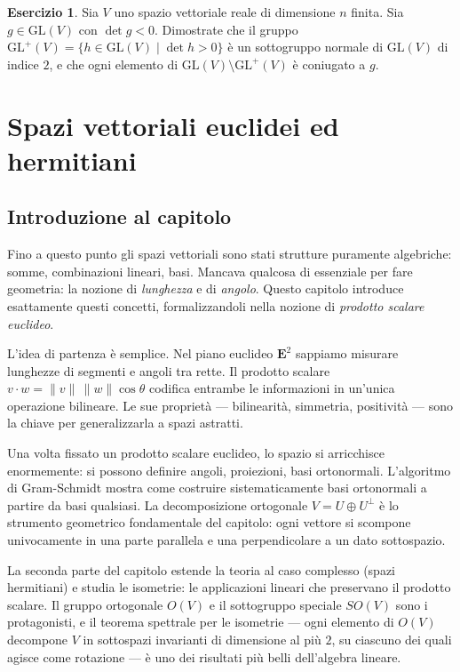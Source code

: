 \documentclass[11pt, a4paper]{book}
\theoremstyle{definition}
\newtheorem{esercizio}[definizione]{Esercizio}
\theoremstyle{plain}
\theoremstyle{remark}
\newcommand{\GL}{\mathrm{GL}}
\begin{document}
\begin{esercizio}
Sia $V$ uno spazio vettoriale reale di dimensione $n$ finita. Sia $g \in \GL(V)$ con $\det g < 0$. Dimostrate che il gruppo $\GL^+(V) = \{h \in \GL(V) \mid \det h > 0\}$ è un sottogruppo normale di $\GL(V)$ di indice $2$, e che ogni elemento di $\GL(V) \setminus \GL^+(V)$ è coniugato a $g$.
\end{esercizio}

\chapter{Spazi vettoriali euclidei ed hermitiani}
\label{cap:euclidei}

\section*{Introduzione al capitolo}

Fino a questo punto gli spazi vettoriali sono stati strutture puramente algebriche: somme, combinazioni lineari, basi. Mancava qualcosa di essenziale per fare geometria: la nozione di \emph{lunghezza} e di \emph{angolo}. Questo capitolo introduce esattamente questi concetti, formalizzandoli nella nozione di \emph{prodotto scalare euclideo}.

L'idea di partenza è semplice. Nel piano euclideo $\mathbf{E}^2$ sappiamo misurare lunghezze di segmenti e angoli tra rette. Il prodotto scalare $v \cdot w = \|v\|\,\|w\|\cos\theta$ codifica entrambe le informazioni in un'unica operazione bilineare. Le sue proprietà — bilinearità, simmetria, positività — sono la chiave per generalizzarla a spazi astratti.

Una volta fissato un prodotto scalare euclideo, lo spazio si arricchisce enormemente: si possono definire angoli, proiezioni, basi ortonormali. L'algoritmo di Gram-Schmidt mostra come costruire sistematicamente basi ortonormali a partire da basi qualsiasi. La decomposizione ortogonale $V = U \oplus U^\perp$ è lo strumento geometrico fondamentale del capitolo: ogni vettore si scompone univocamente in una parte parallela e una perpendicolare a un dato sottospazio.

La seconda parte del capitolo estende la teoria al caso complesso (spazi hermitiani) e studia le isometrie: le applicazioni lineari che preservano il prodotto scalare. Il gruppo ortogonale $O(V)$ e il sottogruppo speciale $SO(V)$ sono i protagonisti, e il teorema spettrale per le isometrie — ogni elemento di $O(V)$ decompone $V$ in sottospazi invarianti di dimensione al più $2$, su ciascuno dei quali agisce come rotazione — è uno dei risultati più belli dell'algebra lineare.
\end{document}
